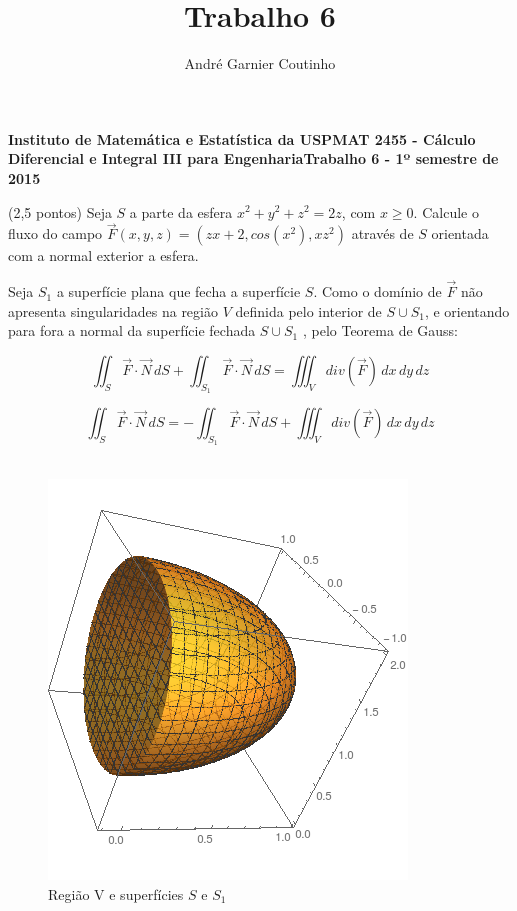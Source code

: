 \documentclass[12pt,a4paper]{article}
\title{Trabalho 6}
\author{André Garnier Coutinho}
\begin{document}
\begin{center}
\textbf{Instituto de Matemática e Estatística da USP\linebreak MAT 2455 - Cálculo Diferencial e Integral III para Engenharia\linebreak Trabalho 6 - 1º semestre de 2015}
\end{center}



 (2,5 pontos) Seja $S$ a parte da esfera $x^2 + y^2 + z^2 = 2z$, com $x \geq 0$. Calcule o fluxo do campo $\vec{F}(x,y,z) = (zx+2, cos(x^2), xz^2)$ através de $S$ orientada com a normal exterior a esfera.


Seja $S_1$ a superfície plana que fecha a superfície $S$. Como o domínio de $\vec{F} $ não apresenta singularidades na região $V$ definida pelo interior de $S \cup S_1 $, e orientando para fora a normal da superfície fechada $S \cup S_1$ , pelo Teorema de Gauss:

$$ \iint_{S} \vec{F}  \cdot \vec{N} \,dS + \iint_{ S_1 } \vec{F}  \cdot \vec{N} \,dS = \iiint_{V} div(\vec{F})  \,dx \,dy \,dz $$

\begin{equation}
\iint_{S} \vec{F}  \cdot \vec{N} \,dS = - \iint_{ S_1 } \vec{F}   \cdot \vec{N} \,dS  + \iiint_{V} div(\vec{F}) \,dx \,dy \,dz
\label{eq:1}
\end{equation} \\


\begin{figure}[h!]
	\centering
	\includegraphics[scale=0.5]{figura1.png}  
	\caption{Região V e superfícies $S$ e $S_1$ }
	\label{fig:figura1}
\end{figure}
\end{document}
